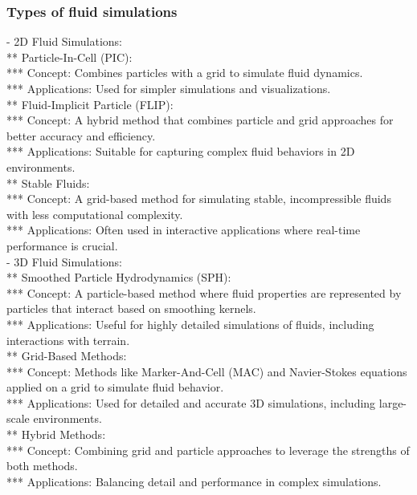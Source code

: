 \subsubsection{Types of fluid simulations}
- 2D Fluid Simulations: \\
** Particle-In-Cell (PIC): \\
*** Concept: Combines particles with a grid to simulate fluid dynamics. \\
*** Applications: Used for simpler simulations and visualizations. \\
** Fluid-Implicit Particle (FLIP): \\
*** Concept: A hybrid method that combines particle and grid approaches for better accuracy and efficiency. \\
*** Applications: Suitable for capturing complex fluid behaviors in 2D environments. \\
** Stable Fluids: \\
*** Concept: A grid-based method for simulating stable, incompressible fluids with less computational complexity. \\
*** Applications: Often used in interactive applications where real-time performance is crucial.\\
- 3D Fluid Simulations: \\
** Smoothed Particle Hydrodynamics (SPH): \\
*** Concept: A particle-based method where fluid properties are represented by particles that interact based on smoothing kernels. \\
*** Applications: Useful for highly detailed simulations of fluids, including interactions with terrain. \\
** Grid-Based Methods: \\
*** Concept: Methods like Marker-And-Cell (MAC) and Navier-Stokes equations applied on a grid to simulate fluid behavior. \\
*** Applications: Used for detailed and accurate 3D simulations, including large-scale environments. \\
** Hybrid Methods: \\
*** Concept: Combining grid and particle approaches to leverage the strengths of both methods.\\
*** Applications: Balancing detail and performance in complex simulations. 

